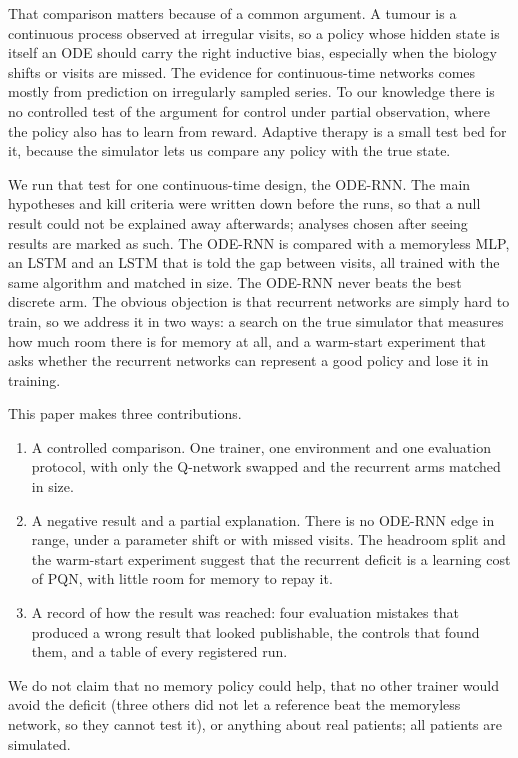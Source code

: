 \documentclass[10pt]{article}
\renewcommand{\cite}{\citep}  %
\begin{document}
That comparison matters because of a common argument. A tumour is a continuous
process observed at irregular visits, so a policy whose hidden state is itself
an ODE \cite{rubanova2019} should carry the right inductive bias, especially
when the biology shifts or visits are missed. The evidence for continuous-time
networks comes mostly from prediction on irregularly sampled series. To our knowledge
there is no controlled test of the argument for control under partial
observation, where the policy also has to learn from reward. Adaptive therapy is a small test bed
for it, because the simulator lets us compare any policy with the true state.

We run that test for one continuous-time design, the ODE-RNN. The main hypotheses and kill criteria were written down before the runs,
so that a null result could not be explained away afterwards; analyses chosen
after seeing results are marked as such. The ODE-RNN is compared with a memoryless MLP,
an LSTM and an LSTM that is told the gap between visits, all trained with the
same algorithm and matched in size. The ODE-RNN never beats the best discrete
arm. The obvious objection is that recurrent networks are simply hard to train,
so we address it in two ways: a search on the true simulator that measures how
much room there is for memory at all, and a warm-start experiment that asks
whether the recurrent networks can represent a good policy and lose it in
training.

This paper makes three contributions.
\begin{enumerate}
\item A controlled comparison. One trainer, one environment and one evaluation
protocol, with only the Q-network swapped and the recurrent arms matched in size.
\item A negative result and a partial explanation. There is no ODE-RNN edge in
range, under a parameter shift or with missed visits. The headroom split and the
warm-start experiment suggest that the recurrent deficit is a learning cost of
PQN, with little room for memory to repay it.
\item A record of how the result was reached: four evaluation mistakes that
produced a wrong result that looked publishable, the controls that found them,
and a table of every registered run.
\end{enumerate}
We do not claim that no memory policy could help, that no other trainer would
avoid the deficit (three others did not let a reference beat the memoryless
network, so they cannot test it), or anything about real patients; all patients are simulated.
\end{document}
